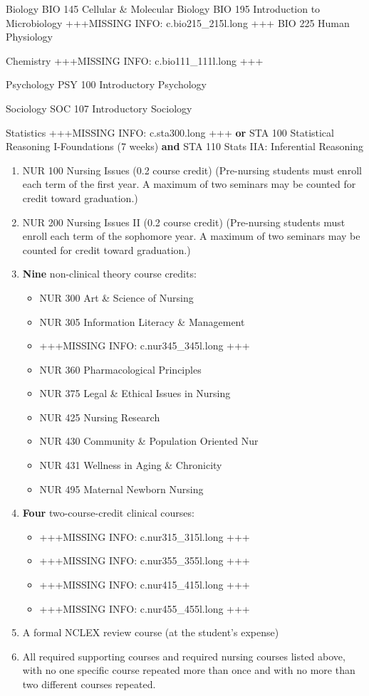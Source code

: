 \documentclass[
  letterpaper,
]{scrbook}
\providecommand{\tightlist}{%
  \setlength{\itemsep}{0pt}\setlength{\parskip}{0pt}}
\begin{document}
Biology BIO 145 Cellular \& Molecular Biology BIO 195 Introduction to
Microbiology +++MISSING INFO: c.bio215\_215l.long +++ BIO 225 Human
Physiology

Chemistry +++MISSING INFO: c.bio111\_111l.long +++

Psychology PSY 100 Introductory Psychology

Sociology SOC 107 Introductory Sociology

Statistics +++MISSING INFO: c.sta300.long +++ \textbf{or} STA 100
Statistical Reasoning I-Foundations (7 weeks) \textbf{and} STA 110 Stats
IIA: Inferential Reasoning

\begin{enumerate}
\def\labelenumi{\arabic{enumi}.}
\setcounter{enumi}{2}
\item
  NUR 100 Nursing Issues (0.2 course credit) (Pre-nursing students must
  enroll each term of the first year. A maximum of two seminars may be
  counted for credit toward graduation.)
\item
  NUR 200 Nursing Issues II (0.2 course credit) (Pre-nursing students
  must enroll each term of the sophomore year. A maximum of two seminars
  may be counted for credit toward graduation.)
\item
  \textbf{Nine} non-clinical theory course credits:

  \begin{itemize}
  \tightlist
  \item
    NUR 300 Art \& Science of Nursing
  \item
    NUR 305 Information Literacy \& Management
  \item
    +++MISSING INFO: c.nur345\_345l.long +++
  \item
    NUR 360 Pharmacological Principles
  \item
    NUR 375 Legal \& Ethical Issues in Nursing
  \item
    NUR 425 Nursing Research
  \item
    NUR 430 Community \& Population Oriented Nur
  \item
    NUR 431 Wellness in Aging \& Chronicity
  \item
    NUR 495 Maternal Newborn Nursing
  \end{itemize}
\item
  \textbf{Four} two-course-credit clinical courses:

  \begin{itemize}
  \tightlist
  \item
    +++MISSING INFO: c.nur315\_315l.long +++
  \item
    +++MISSING INFO: c.nur355\_355l.long +++
  \item
    +++MISSING INFO: c.nur415\_415l.long +++
  \item
    +++MISSING INFO: c.nur455\_455l.long +++
  \end{itemize}
\item
  A formal NCLEX review course (at the student's expense)
\item
  All required supporting courses and required nursing courses listed
  above, with no one specific course repeated more than once and with no
  more than two different courses repeated.
\end{enumerate}
\end{document}
